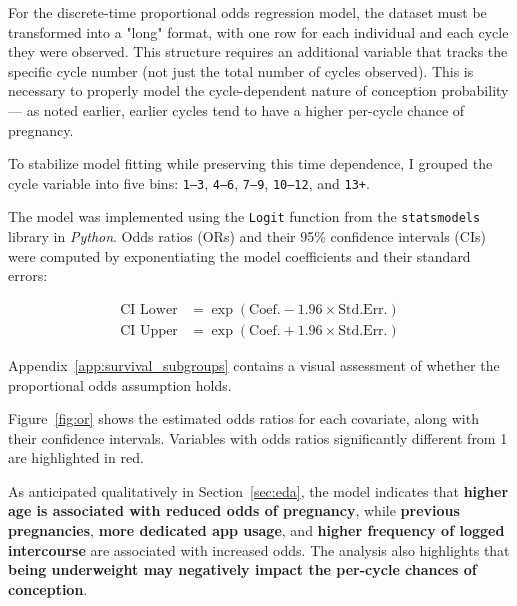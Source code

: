 \documentclass[11pt]{article}
\begin{document}
For the discrete-time proportional odds regression model, the dataset must be transformed into a "long" format, with one row for each individual and each cycle they were observed. This structure requires an additional variable that tracks the specific cycle number (not just the total number of cycles observed). This is necessary to properly model the cycle-dependent nature of conception probability — as noted earlier, earlier cycles tend to have a higher per-cycle chance of pregnancy.

To stabilize model fitting while preserving this time dependence, I grouped the cycle variable into five bins: \texttt{1--3}, \texttt{4--6}, \texttt{7--9}, \texttt{10--12}, and \texttt{13+}.

The model was implemented using the \texttt{Logit} function from the \texttt{statsmodels} library in \textit{Python}. Odds ratios (ORs) and their 95\% confidence intervals (CIs) were computed by exponentiating the model coefficients and their standard errors:

\begin{equation*}
\begin{aligned}
\text{CI Lower} &= \exp\left(\text{Coef.} - 1.96 \times \text{Std.Err.}\right) \\
\text{CI Upper} &= \exp\left(\text{Coef.} + 1.96 \times \text{Std.Err.}\right)
\end{aligned}
\end{equation*}

Appendix~\ref{app:survival_subgroups} contains a visual assessment of whether the proportional odds assumption holds.

Figure~\ref{fig:or} shows the estimated odds ratios for each covariate, along with their confidence intervals. Variables with odds ratios significantly different from 1 are highlighted in red.

As anticipated qualitatively in Section~\ref{sec:eda}, the model indicates that \textbf{higher age is associated with reduced odds of pregnancy}, while \textbf{previous pregnancies}, \textbf{more dedicated app usage}, and \textbf{higher frequency of logged intercourse} are associated with increased odds. The analysis also highlights that \textbf{being underweight may negatively impact the per-cycle chances of conception}.
\end{document}
